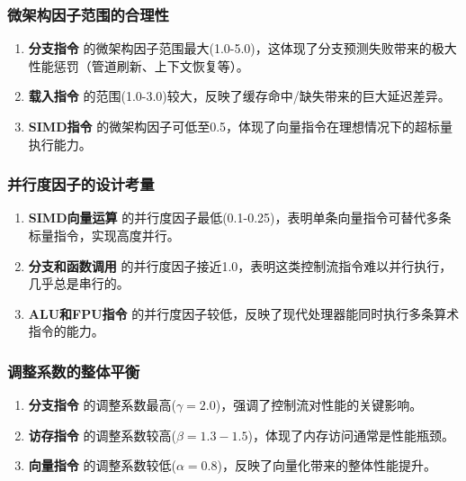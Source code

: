 \documentclass[bachelor]{thesis-uestc}
\begin{document}
\subsubsection{微架构因子范围的合理性}

\begin{enumerate}
    \item \textbf{分支指令} 的微架构因子范围最大(1.0-5.0)，这体现了分支预测失败带来的极大性能惩罚（管道刷新、上下文恢复等）。
    
    \item \textbf{载入指令} 的范围(1.0-3.0)较大，反映了缓存命中/缺失带来的巨大延迟差异。
    
    \item \textbf{SIMD指令} 的微架构因子可低至0.5，体现了向量指令在理想情况下的超标量执行能力。
\end{enumerate}

\subsubsection{并行度因子的设计考量}

\begin{enumerate}
    \item \textbf{SIMD向量运算} 的并行度因子最低(0.1-0.25)，表明单条向量指令可替代多条标量指令，实现高度并行。
    
    \item \textbf{分支和函数调用} 的并行度因子接近1.0，表明这类控制流指令难以并行执行，几乎总是串行的。
    
    \item \textbf{ALU和FPU指令} 的并行度因子较低，反映了现代处理器能同时执行多条算术指令的能力。
\end{enumerate}

\subsubsection{调整系数的整体平衡}

\begin{enumerate}
    \item \textbf{分支指令} 的调整系数最高($\gamma = 2.0$)，强调了控制流对性能的关键影响。
    
    \item \textbf{访存指令} 的调整系数较高($\beta = 1.3-1.5$)，体现了内存访问通常是性能瓶颈。
    
    \item \textbf{向量指令} 的调整系数较低($\alpha = 0.8$)，反映了向量化带来的整体性能提升。
\end{enumerate}
\end{document}

